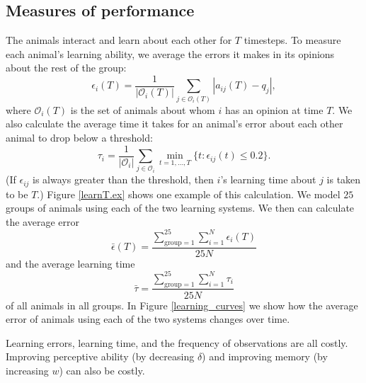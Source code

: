 \subsection{Measures of performance }
The animals interact and learn about each other for $T$ timesteps. To measure each animal's learning ability, we average the errors it makes in its opinions about the rest of the group: 
\begin{equation*}
\epsilon_i(T) = \frac{1}{|\mathscr{O}_i(T)|}\sum_{j\in \mathscr{O}_i(T)}|a_{ij}(T)-q_j|,
\end{equation*}
where $\mathscr{O}_i(T)$ is the set of animals about whom $i$ has an opinion at time $T$.  
We also calculate the average time it takes for an animal's error about each other animal to drop below a threshold:
\begin{equation*}
\tau_{i} = \frac{1}{|\mathscr{O}_i|} \sum_{j\in\mathscr{O}_i} \min_{t=1,\dots,T}\{t: \epsilon_{ij}(t)\leq 0.2 \}.
\end{equation*}
(If $\epsilon_{ij}$ is always greater than the threshold, then $i$'s learning time about $j$ is taken to be $T$.) Figure \ref{learnT.ex} shows one example of this calculation. We model $25$ groups of animals using each of the two learning systems. We then can calculate the average error $$\bar{\epsilon}(T)=\frac{\sum_{\text{group}=1}^{25}\sum_{i=1}^N\epsilon_i(T)}{25N}$$ and the average learning time $$\bar{\tau}=\frac{\sum_{\text{group}=1}^{25}\sum_{i=1}^N\tau_i}{25N}$$ of all animals in all groups. In Figure \ref{learning_curves} we show how the average error of animals using each of the two systems changes over time.

Learning errors, learning time, and the frequency of observations are all costly. 
Improving  perceptive ability (by decreasing $\delta$) and improving memory (by increasing $w$) can also be costly. 

